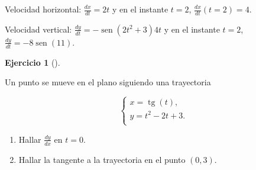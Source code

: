 \documentclass[
  spanish,
  a4paper,
]{scrreport}
\providecommand{\tightlist}{%
  \setlength{\itemsep}{0pt}\setlength{\parskip}{0pt}}
\theoremstyle{definition}
\newtheorem{exercise}{Ejercicio}[chapter]
\theoremstyle{remark}
\begin{document}
\begin{tcolorbox}[enhanced jigsaw, arc=.35mm, bottomrule=.15mm, bottomtitle=1mm, breakable, colback=white, colbacktitle=quarto-callout-tip-color!10!white, colframe=quarto-callout-tip-color-frame, coltitle=black, left=2mm, leftrule=.75mm, opacityback=0, opacitybacktitle=0.6, rightrule=.15mm, title=\textcolor{quarto-callout-tip-color}{\faLightbulb}\hspace{0.5em}{Solución}, titlerule=0mm, toprule=.15mm, toptitle=1mm]

Velocidad horizontal: \(\frac{dx}{dt} = 2t\) y en el instante \(t=2\),
\(\frac{dx}{dt}(t=2)=4\).

Velocidad vertical: \(\frac{dy}{dt}=-\operatorname{sen}(2t^2+3)4t\) y en
el instante \(t=2\), \(\frac{dy}{dt}=-8\operatorname{sen}(11)\).

\end{tcolorbox}

\begin{exercise}[]\protect\hypertarget{exr-cinematica-tangente-trayectoria}{}\label{exr-cinematica-tangente-trayectoria}

Un punto se mueve en el plano siguiendo una trayectoria

\[
\begin{cases}
x = \operatorname{tg}(t),  \\
y = t^2-2t+3. \\
\end{cases}
\]

\begin{enumerate}
\def\labelenumi{\alph{enumi}.}
\tightlist
\item
  Hallar \(\frac{dy}{dx}\) en \(t=0\).
\item
  Hallar la tangente a la trayectoria en el punto \((0,3)\).
\end{enumerate}

\end{exercise}
\end{document}

